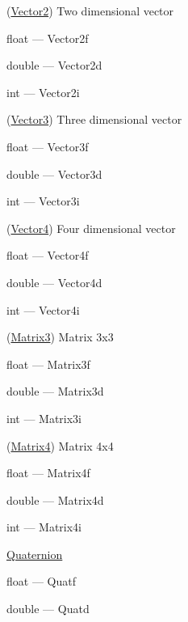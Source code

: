 \begin{DoxyItemize}
\item (\hyperlink{class_vector2}{Vector2}) Two dimensional vector 
\begin{DoxyItemize}
\item float --- Vector2f 
\item double --- Vector2d 
\item int --- Vector2i 
\end{DoxyItemize}
\item (\hyperlink{class_vector3}{Vector3}) Three dimensional vector 
\begin{DoxyItemize}
\item float --- Vector3f 
\item double --- Vector3d 
\item int --- Vector3i 
\end{DoxyItemize}
\item (\hyperlink{class_vector4}{Vector4}) Four dimensional vector 
\begin{DoxyItemize}
\item float --- Vector4f 
\item double --- Vector4d 
\item int --- Vector4i 
\end{DoxyItemize}
\item (\hyperlink{class_matrix3}{Matrix3}) Matrix 3x3 
\begin{DoxyItemize}
\item float --- Matrix3f 
\item double --- Matrix3d 
\item int --- Matrix3i 
\end{DoxyItemize}
\item (\hyperlink{class_matrix4}{Matrix4}) Matrix 4x4 
\begin{DoxyItemize}
\item float --- Matrix4f 
\item double --- Matrix4d 
\item int --- Matrix4i 
\end{DoxyItemize}
\item \hyperlink{class_quaternion}{Quaternion} 
\begin{DoxyItemize}
\item float --- Quatf 
\item double --- Quatd 
\end{DoxyItemize}
\end{DoxyItemize}